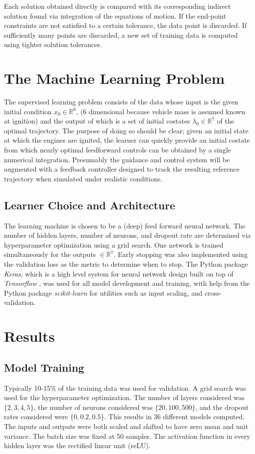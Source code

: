 \documentclass[10pt,a4paper]{article}
\begin{document}
Each solution obtained directly is compared with its corresponding indirect solution found via integration of the equations of motion. If the end-point constraints are not satisfied to a certain tolerance, the data point is discarded. If sufficiently many points are discarded, a new set of training data is computed using tighter solution tolerances. 
	
 
\section{The Machine Learning Problem}
The supervised learning problem consists of the data whose input is the given initial condition $ x_0 \in\mathbb{R}^6 $, (6 dimensional because vehicle mass is assumed known at ignition) and the output of which is a set of initial costates $\lambda_0\in\mathbb{R}^7$ of the optimal trajectory. The purpose of doing so should be clear; given an initial state at which the engines are ignited, the learner can quickly provide an initial costate from which nearly optimal feedforward controls can be obtained by a single numerical integration. Presumably the guidance and control system will be augmented with a feedback controller designed to track the resulting reference trajectory when simulated under realistic conditions.

\subsection{Learner Choice and Architecture}
The learning machine is chosen to be a (deep) feed forward neural network. The number of hidden layers, number of neurons, and dropout rate are determined via hyperparameter optimization using a grid search. One network is trained simultaneously for the outputs $\in\mathbb{R}^7$. Early stopping was also implemented using the validation loss as the metric to determine when to stop. The Python package \textit{Keras}, which is a high level system for neural network design built on top of \textit{Tensorflow} \cite{Tensorflow}, was used for all model development and training, with help from the Python package \textit{scikit-learn} \cite{sklearn} for utilities such as input scaling, and cross-validation.

\section{Results}	

\subsection{Model Training}
Typically 10-15\% of the training data was used for validation. A grid search was used for the hyperparameter optimization. The number of layers considered was $\{2,3,4,5\}$, the number of neurons considered was $\{20,100,500\}$, and the dropout rates considered were $\{0,0.2,0.5\}$. This results in 36 different models computed. The inputs and outputs were both scaled and shifted to have zero mean and unit variance. The batch size was fixed at 50 samples. The activation function in every hidden layer was the rectified linear unit (reLU).
\end{document}
